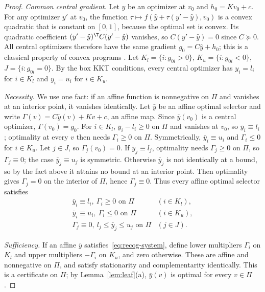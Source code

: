 \begin{proof}
\emph{Common central gradient.} Let $\hat y$ be an optimizer at $v_0$ and
$h_0=Kv_0+c$. For any optimizer $y'$ at $v_0$, the function
$\tau\mapsto f(\hat y+\tau(y'-\hat y),v_0)$ is a convex quadratic that is
constant on $[0,1]$, because the optimal set is convex. Its quadratic
coefficient $(y'-\hat y)^{\T}C(y'-\hat y)$ vanishes, so $C(y'-\hat y)=0$
since $C\succeq0$. All central optimizers therefore have the same gradient
$g_0=C\hat y+h_0$; this is a classical property of convex programs
\cite{Mangasarian1988}. Let $K_l=\{i:g_{0i}>0\}$, $K_u=\{i:g_{0i}<0\}$,
$J=\{i:g_{0i}=0\}$. By the box KKT conditions, every central optimizer has
$y_i=l_i$ for $i\in K_l$ and $y_i=u_i$ for $i\in K_u$.

\emph{Necessity.} We use one fact: if an affine function is nonnegative on
$\Pi$ and vanishes at an interior point, it vanishes identically. Let
$\bar y$ be an affine optimal selector and write
$\Gamma(v)=C\bar y(v)+Kv+c$, an affine map. Since $\bar y(v_0)$ is a central
optimizer, $\Gamma(v_0)=g_0$. For $i\in K_l$, $\bar y_i-l_i\ge0$ on $\Pi$ and
vanishes at $v_0$, so $\bar y_i\equiv l_i$; optimality at every $v$ then needs
$\Gamma_i\ge0$ on $\Pi$. Symmetrically, $\bar y_i\equiv u_i$ and $\Gamma_i\le0$
for $i\in K_u$. Let $j\in J$, so $\Gamma_j(v_0)=0$. If $\bar y_j\equiv l_j$,
optimality needs $\Gamma_j\ge0$ on $\Pi$, so $\Gamma_j\equiv0$; the case
$\bar y_j\equiv u_j$ is symmetric. Otherwise $\bar y_j$ is not identically at a
bound, so by the fact above it attains no bound at an interior point. Then
optimality gives $\Gamma_j=0$ on the interior of $\Pi$, hence
$\Gamma_j\equiv0$. Thus every affine optimal selector satisfies
\begin{equation}\label{eq:recog-system}
\begin{array}{ll}
\bar y_i\equiv l_i,\ \Gamma_i\ge0\text{ on }\Pi & (i\in K_l),\\
\bar y_i\equiv u_i,\ \Gamma_i\le0\text{ on }\Pi & (i\in K_u),\\
\Gamma_j\equiv0,\ l_j\le\bar y_j\le u_j\text{ on }\Pi & (j\in J).
\end{array}
\end{equation}

\emph{Sufficiency.} If an affine $\bar y$ satisfies~\eqref{eq:recog-system},
define lower multipliers $\Gamma_i$ on $K_l$ and upper multipliers $-\Gamma_i$ on
$K_u$, and zero otherwise. These are affine and nonnegative on $\Pi$, and
satisfy stationarity and complementarity identically. This is a certificate
on $\Pi$; by Lemma~\ref{lem:leaf}(a), $\bar y(v)$ is optimal for every
$v\in\Pi$.


\end{proof}
